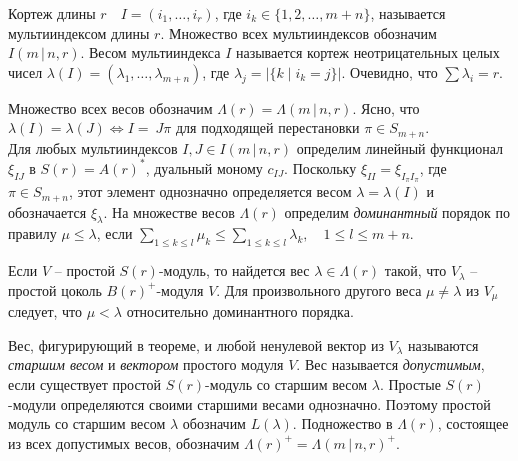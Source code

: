
\begin{definition}
Кортеж длины $r \quad I = (i_1, \ldots, i_r) $, где $ i_k \in \{1, 2, \ldots, m+n\} $, называется мультииндексом длины $r$. 
Множество всех мультииндексов обозначим $ I(m \,|\, n, r) $.
Весом мультииндекса $I$ называется кортеж неотрицательных целых чисел $ \lambda (I) = (\lambda_1, \ldots, \lambda_{m + n}) $, 
где $ \lambda_j = | \{k \;|\; i_k = j\} |$. Очевидно, что $\sum \lambda_i = r $. 
\end{definition}
Множество всех весов обозначим $ \Lambda(r) = \Lambda(m\,|\,n, r) $. 
Ясно, что $ \lambda(I) = \lambda(J) \iff I = ~J\pi $ для подходящей перестановки $ \pi \in S_{m+n} $. \\
Для любых мультииндексов $ I, J  \in I(m \,|\, n, r) $ определим линейный функционал $\xi_{IJ}$ в $ S(r) = A(r)^* $, дуальный моному $ c_{IJ} $.
Поскольку $ \xi_{II} = \xi_{I_{\pi} I_{\pi}} $, где $ \pi \in S_{m + n} $, этот элемент однозначно определяется 
весом $ \lambda = \lambda(I) $ и обозначается $ \xi_{\lambda} $.
На множестве весов $\Lambda(r)$ определим \textit{доминантный} порядок по правилу $ \mu \leq \lambda $, 
если $ \sum\limits_{1 \leqslant k \leqslant l} \mu_k \leq \sum\limits_{1 \leqslant k \leqslant l} \lambda_k, \quad 1 \leqslant l \leqslant m + n $.
\begin{theorem}
Если $V$ -- простой $S(r)$-модуль, то найдется вес $\lambda \in \Lambda(r)$ такой, что $ V_{\lambda} $ -- простой цоколь $ B(r)^+ $-модуля $V$. 
Для произвольного другого веса $ \mu \neq \lambda $ из $ V_{\mu} $ следует, что $ \mu < \lambda $ относительно доминантного порядка.
\end{theorem}
Вес, фигурирующий в теореме, и любой ненулевой вектор из $ V_{\lambda} $ называются \textit{старшим весом} и \textit{вектором} простого модуля $V$.
Вес называется \textit{допустимым}, если существует простой $ S(r) $-модуль со старшим весом $\lambda$. 
Простые $S(r)$-модули определяются своими  старшими весами однозначно. Поэтому простой модуль со старшим весом $\lambda$ обозначим $L(\lambda)$. 
Подножество в $\Lambda(r)$, состоящее из всех допустимых весов, обозначим $ \Lambda(r)^+ = \Lambda(m\,|\,n, r)^+ $.
